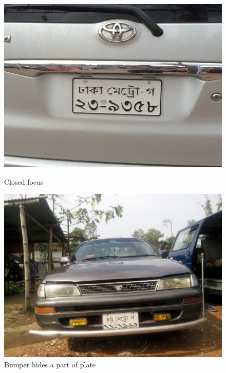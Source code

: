 \documentclass{standalone}
\begin{document}
\begin{figure}
\centering
\begin{minipage}{.45\textwidth}
  \centering
  \includegraphics[width=0.9\linewidth]{./img/experiment/stage.1/big}
  \caption{Closed focus}
\end{minipage}
\begin{minipage}{.45\textwidth}
  \centering
  \includegraphics[width=0.9\linewidth]{./img/experiment/stage.1/bumper}
  \caption{Bumper hides a part of plate} 
\end{minipage}
\end{figure}
\end{document}
